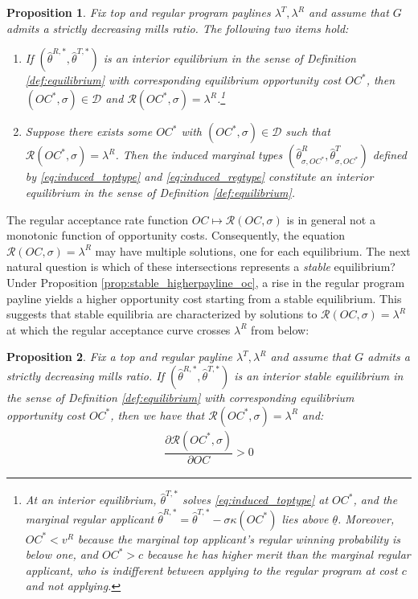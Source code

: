 \documentclass[12pt,reqno]{amsart}
\newtheorem{proposition}{Proposition}
\theoremstyle{definition}
\theoremstyle{plain} %
\begin{document}
\begin{proposition}\label{prop:equivalence_eqm}
Fix top and regular program paylines $\lambda^T, \lambda^R$ and assume that $G$ admits a strictly decreasing mills ratio. The following two items hold:
\vspace{-5pt}
\begin{enumerate}[label=(\arabic*),ref=\theproposition(\arabic*)]
   \item If $(\hat{\theta}^{R,*},\hat{\theta}^{T,*})$ is an interior equilibrium in the sense of Definition \ref{def:equilibrium} with corresponding equilibrium opportunity cost $OC^*$, then $(OC^*,\sigma)\in\mathcal{D}$ and $\mathcal{R}(OC^*,\sigma) = \lambda^R$.\footnote{At an interior equilibrium, $\hat{\theta}^{T,*}$ solves \eqref{eq:induced_toptype} at $OC^*$, and the marginal regular applicant $\hat{\theta}^{R,*}=\hat{\theta}^{T,*}-\sigma\kappa(OC^*)$ lies above $\underline{\theta}$. Moreover, $OC^*<v^R$ because the marginal top applicant's regular winning probability is below one, and $OC^*>c$ because he has higher merit than the marginal regular applicant, who is indifferent between applying to the regular program at cost $c$ and not applying.}
   \item Suppose there exists some $OC^*$ with $(OC^*,\sigma)\in\mathcal{D}$ such that $\mathcal{R}(OC^*,\sigma) = \lambda^R$. Then the induced marginal types $(\hat{\theta}^R_{\sigma,OC^*},\hat{\theta}^T_{\sigma,OC^*})$ defined by \eqref{eq:induced_toptype} and  \eqref{eq:induced_regtype} constitute an interior equilibrium in the sense of Definition \ref{def:equilibrium}. 
\end{enumerate}
\end{proposition}
\noindent  The regular acceptance rate function $OC\mapsto \mathcal{R}(OC,\sigma)$ is in general not a monotonic function of opportunity costs. Consequently, the equation $\mathcal{R}(OC,\sigma) = \lambda^R$ may have multiple solutions, one for each equilibrium. The next natural question is which of these intersections represents a \textit{stable} equilibrium? Under Proposition \ref{prop:stable_higherpayline_oc}, a rise in the regular program payline yields a higher opportunity cost starting from a stable equilibrium. This suggests that stable equilibria are characterized by solutions to $\mathcal{R}(OC,\sigma) = \lambda^R$ at which the regular acceptance curve crosses $\lambda^R$ from below:

\begin{proposition}\label{prop:reg_acceptance_stable_frombelow}
Fix a top and regular payline $\lambda^T,\lambda^R$ and assume that $G$ admits a strictly decreasing mills ratio. If $(\hat{\theta}^{R,*},\hat{\theta}^{T,*})$ is an interior stable equilibrium in the sense of Definition \ref{def:equilibrium} with corresponding equilibrium opportunity cost $OC^*$, then we have that $\mathcal{R}(OC^*,\sigma) = \lambda^R$ and:
\begin{align*}
  \dfrac{\partial \mathcal{R}(OC^*,\sigma)}{\partial OC} > 0
\end{align*}
\end{proposition}
\end{document}
